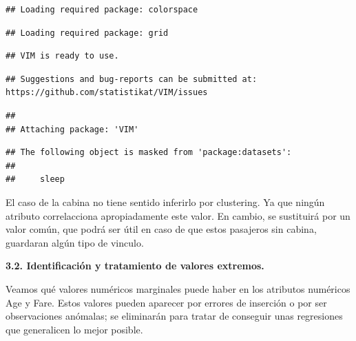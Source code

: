 \documentclass[]{article}
\newenvironment{Shaded}{\begin{snugshade}}{\end{snugshade}}
\newcommand{\KeywordTok}[1]{\textcolor[rgb]{0.13,0.29,0.53}{\textbf{#1}}}
\newcommand{\NormalTok}[1]{#1}
\newcommand{\OperatorTok}[1]{\textcolor[rgb]{0.81,0.36,0.00}{\textbf{#1}}}
\newcommand{\StringTok}[1]{\textcolor[rgb]{0.31,0.60,0.02}{#1}}
\begin{document}
\begin{verbatim}
## Loading required package: colorspace
\end{verbatim}

\begin{verbatim}
## Loading required package: grid
\end{verbatim}

\begin{verbatim}
## VIM is ready to use.
\end{verbatim}

\begin{verbatim}
## Suggestions and bug-reports can be submitted at: https://github.com/statistikat/VIM/issues
\end{verbatim}

\begin{verbatim}
## 
## Attaching package: 'VIM'
\end{verbatim}

\begin{verbatim}
## The following object is masked from 'package:datasets':
## 
##     sleep
\end{verbatim}

\begin{Shaded}
\end{Shaded}

El caso de la cabina no tiene sentido inferirlo por clustering. Ya que
ningún atributo correlacciona apropiadamente este valor. En cambio, se
sustituirá por un valor común, que podrá ser útil en caso de que estos
pasajeros sin cabina, guardaran algún tipo de vinculo.

\begin{Shaded}
\end{Shaded}

\textbf{3.2. Identificación y tratamiento de valores extremos.}

Veamos qué valores numéricos marginales puede haber en los atributos
numéricos Age y Fare. Estos valores pueden aparecer por errores de
inserción o por ser observaciones anómalas; se eliminarán para tratar de
conseguir unas regresiones que generalicen lo mejor posible.
\end{document}
